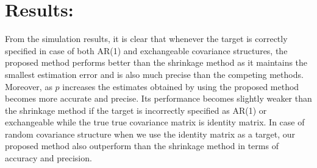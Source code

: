 \section*{Results:}
From the simulation results, it is clear that whenever the target is correctly specified in case of both AR(1) and exchangeable covariance structures, the proposed method performs better than the shrinkage method as it maintains the smallest estimation error and is also much precise than the competing methods. Moreover, as $p$ increases the estimates obtained by using the proposed method becomes more accurate and precise. Its performance becomes slightly weaker than the shrinkage method if the target is incorrectly specified as AR(1) or exchangeable while the true true covariance matrix is identity matrix. In case of random covariance structure when we use the identity matrix as a target, our proposed method also outperform than the shrinkage method in terms of accuracy and precision. 

